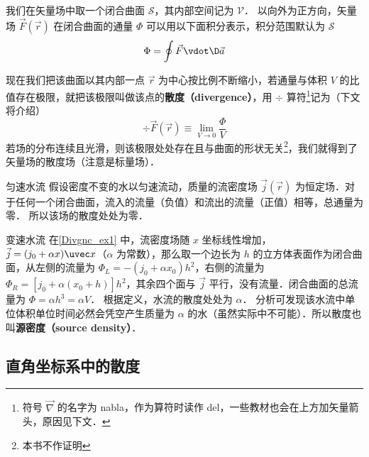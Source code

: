 

我们在矢量场中取一个闭合曲面 $\mathcal{S}$，其内部空间记为 $\mathcal{V}$． 以向外为正方向，矢量场 $\vec F(\vec r)$ 在闭合曲面的通量 $\Phi$ 可以用以下面积分表示，积分范围默认为 $\mathcal{S}$
\begin{equation}
\Phi  = \oint {\vec F \vdot \D\vec a} 
\end{equation}

现在我们把该曲面以其内部一点 $\vec r$ 为中心按比例不断缩小，若通量与体积 $V$ 的比值存在极限，就把该极限叫做该点的\textbf{散度（divergence）}，用 $\div$ 算符\footnote{符号 $\vec\nabla$ 的名字为 nabla，作为算符时读作 del，一些教材也会在上方加矢量箭头，原因见下文．}记为（下文将介绍）
\begin{equation}\label{Divgnc_eq2}
\div \vec F(\vec r) \equiv \mathop {\lim }\limits_{V \to 0} \frac{\Phi }{V}
\end{equation}
若场的分布连续且光滑，则该极限处处存在且与曲面的形状无关\footnote{本书不作证明}，我们就得到了矢量场的散度场（注意是标量场）．

\begin{exam}{匀速水流}\label{Divgnc_ex1}
假设密度不变的水以匀速流动，质量的流密度场 $\vec j(\vec r)$ 为恒定场．对于任何一个闭合曲面，流入的流量（负值）和流出的流量（正值）相等，总通量为零． 所以该场的散度处处为零．
\end{exam}

\begin{exam}{变速水流}
在\autoref{Divgnc_ex1} 中，流密度场随 $x$ 坐标线性增加， $\vec j = ({j_0} + \alpha x)\uvec x$（$\alpha$ 为常数），那么取一个边长为 $h$ 的立方体表面作为闭合曲面，从左侧的流量为 ${\Phi _L} =  - ({j_0} + \alpha {x_0}){h^2}$，右侧的流量为 ${\Phi _R} = [{j_0} + \alpha ({x_0} + h)]{h^2}$，其余四个面与 $\vec j$ 平行，没有流量．闭合曲面的总流量为 $\Phi  = \alpha {h^3} = \alpha V$． 根据定义，水流的散度处处为 $\alpha$． 分析可发现该水流中单位体积单位时间必然会凭空产生质量为 $\alpha$ 的水（虽然实际中不可能）．所以散度也叫\textbf{源密度（source density）}．
\end{exam}

\subsection{直角坐标系中的散度}

